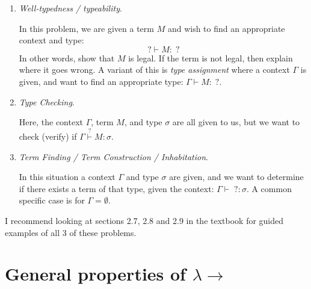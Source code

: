 \documentclass[letterpaper]{article}
\newcommand{\larr}{\lambda \!\! \rightarrow}
\begin{document}
\begin{enumerate}
	\item \emph{Well-typedness / typeability}.
	
	In this problem, we are given a term $M$ and wish to find an appropriate context and type:
	\[
		? \vdash M : \; ?
	\]
	In other words, show that $M$ is legal. If the term is not legal, then explain where it goes wrong. A variant of this is \emph{type assignment} where a context $\Gamma$ is given, and want to find an appropriate type: $\Gamma \vdash M : \; ?$.

	\item \emph{Type Checking}.
	
	Here, the context $\Gamma$, term $M$, and type $\sigma$ are all given to us, but we want to check (verify) if $\Gamma \overset{?}{\vdash} M : \sigma$.

	\item \emph{Term Finding / Term Construction / Inhabitation}.
	
	In this situation a context $\Gamma$ and type $\sigma$ are given, and we want to determine if there exists a term of that type, given the context: $\Gamma \vdash \; ? : \sigma$. A common specific case is for $\Gamma = \emptyset$.
\end{enumerate}
I recommend looking at sections 2.7, 2.8 and 2.9 in the textbook for guided examples of all 3 of these problems.

\section{General properties of $\larr$}






\end{document}

